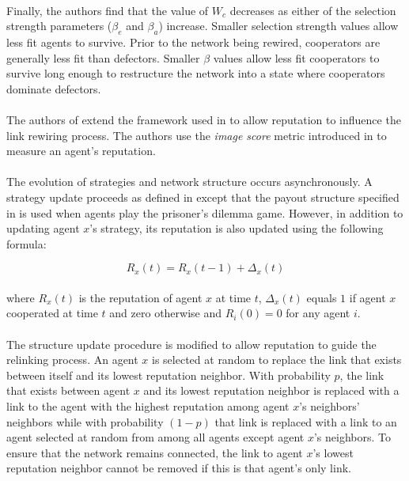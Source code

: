 \documentclass{article}
\begin{document}
	\paragraph{}Finally, the authors find that the value of $W_c$ decreases as either of the selection strength parameters ($\beta_e$ and $\beta_a$) increase.  Smaller selection strength values allow less fit agents to survive.  Prior to the network being rewired, cooperators are generally less fit than defectors.  Smaller $\beta$ values allow less fit cooperators to survive long enough to restructure the network into a state where cooperators dominate defectors.
	\paragraph{}The authors of \cite{Fu2008} extend the framework used in \cite{Santos2006d} to allow reputation to influence the link rewiring process.  The authors use the \textit{image score} metric introduced in \cite{Nowak1998} to measure an agent’s reputation.
	\paragraph{}The evolution of strategies and network structure occurs asynchronously.  A strategy update proceeds as defined in \cite{Santos2006d} except that the payout structure specified in \cite{Nowak1992} is used when agents play the prisoner’s dilemma game.  However, in addition to updating agent $x$'s strategy, its reputation is also updated using the following formula:
	
	\begin{equation}
	R_x(t)=R_x(t-1)+\Delta_x(t)
	\end{equation}

	\paragraph{}where $R_x(t)$ is the reputation of agent $x$ at time $t$, $\Delta_x(t)$ equals $1$ if agent $x$ cooperated at time $t$ and zero otherwise and $R_i(0)=0$ for any agent $i$.
	\paragraph{}The structure update procedure is modified to allow reputation to guide the relinking process.  An agent $x$ is selected at random to replace the link that exists between itself and its lowest reputation neighbor.  With probability $p$, the link that exists between agent $x$ and its lowest reputation neighbor is replaced with a link to the agent with the highest reputation among agent $x$'s neighbors' neighbors while with probability $(1-p)$ that link is replaced with a link to an agent selected at random from among all agents except agent $x$'s neighbors.  To ensure that the network remains connected, the link to agent $x$'s lowest reputation neighbor cannot be removed if this is that agent’s only link.
\end{document}
